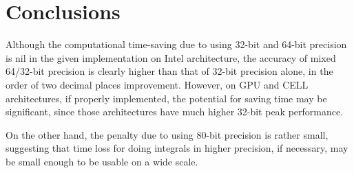 \documentclass[12pt]{article}
\begin{document}
 
\section{Conclusions}
Although the computational time-saving due to using 32-bit and 64-bit precision
 is nil in the given implementation on Intel architecture,
the accuracy of mixed 64/32-bit precision is clearly higher than that of 32-bit precision alone, in the order of two decimal places improvement.
  However, on GPU and CELL architectures, if properly implemented, the potential for saving time 
may be significant, since those architectures have much higher 32-bit peak performance.

On the other hand, the penalty due to using 80-bit precision is rather small, suggesting that time loss for doing integrals in higher precision,
 if necessary, may be small enough to be usable on a wide scale.


  
\end{document}

